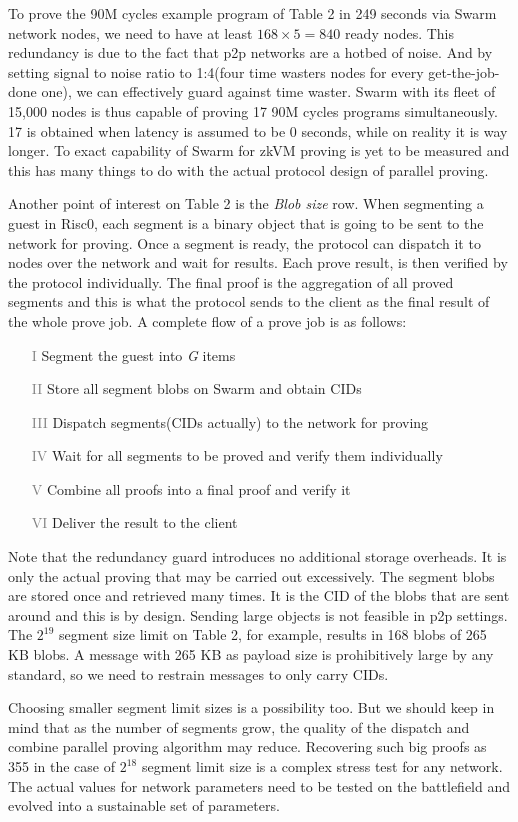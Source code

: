 \documentclass[a4paper, 10pt]{article}
\begin{document}
\par
To prove the 90M cycles example program of Table 2 in 249 seconds via Swarm network nodes, we need to have at least $168 \times 5 = 840$ ready nodes. This redundancy is due to the fact that p2p networks are a hotbed of noise. And by setting signal to noise ratio to 1:4(four time wasters nodes for every get-the-job-done one), we can effectively guard against time waster. Swarm with its fleet of 15,000 nodes is thus capable of proving 17 90M cycles programs simultaneously. 17 is obtained when latency is assumed to be 0 seconds, while on reality it is way longer. To exact capability of Swarm for zkVM proving is yet to be measured and this has many things to do with the actual protocol design of parallel proving.
\par
Another point of interest on Table 2 is the \textit{Blob size} row. When segmenting a guest in Risc0, each segment is a binary object that is going to be sent to the network for proving. Once a segment is ready, the protocol can dispatch it to nodes over the network and wait for results. Each prove result, is then verified by the protocol individually. The final proof is the aggregation of all proved segments and this is what the protocol sends to the client as the final result of the whole prove job. A complete flow of a prove job is as follows:
\begin{itemize}
    \item[\textcolor{gray}{I}] Segment the guest into \textit{G} items
    \item[\textcolor{gray}{II}] Store all segment blobs on Swarm and obtain CIDs
    \item[\textcolor{gray}{III}] Dispatch segments(CIDs actually) to the network for proving
    \item[\textcolor{gray}{IV}] Wait for all segments to be proved and verify them individually
    \item[\textcolor{gray}{V}] Combine all proofs into a final proof and verify it
    \item[\textcolor{gray}{VI}] Deliver the result to the client
\end{itemize}
Note that the redundancy guard introduces no additional storage overheads. It is only the actual proving that may be carried out excessively. The segment blobs are stored once and retrieved many times. It is the CID of the blobs that are sent around and this is by design. Sending large objects is not feasible in p2p settings. The $2^{19}$ segment size limit on Table 2, for example, results in 168 blobs of 265 KB blobs. A message with 265 KB as payload size is prohibitively large by any standard, so we need to restrain messages to only carry CIDs. 
\par
Choosing smaller segment limit sizes is a possibility too. But we should keep in mind that as the number of segments grow, the quality of the dispatch and combine parallel proving algorithm may reduce. Recovering such big proofs as 355 in the case of $2^{18}$ segment limit size is a complex stress test for any network. The actual values for network parameters need to be tested on the battlefield and evolved into a sustainable set of parameters.
\end{document}
